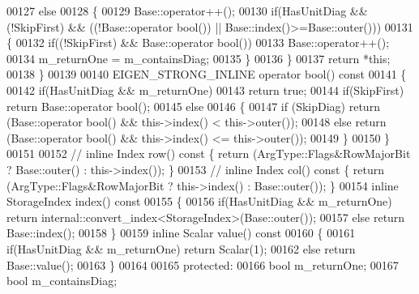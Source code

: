 \begin{DoxyCode}
00127         \textcolor{keywordflow}{else}
00128         \{
00129           Base::operator++();
00130           \textcolor{keywordflow}{if}(HasUnitDiag && (!SkipFirst) && ((!Base::operator \textcolor{keywordtype}{bool}()) || Base::index()>=Base::outer()))
00131           \{
00132             \textcolor{keywordflow}{if}((!SkipFirst) && Base::operator \textcolor{keywordtype}{bool}())
00133               Base::operator++();
00134             m\_returnOne = m\_containsDiag;
00135           \}
00136         \}
00137         \textcolor{keywordflow}{return} *\textcolor{keyword}{this};
00138       \}
00139       
00140       EIGEN\_STRONG\_INLINE \textcolor{keyword}{operator} bool()\textcolor{keyword}{ const}
00141 \textcolor{keyword}{      }\{
00142         \textcolor{keywordflow}{if}(HasUnitDiag && m\_returnOne)
00143           \textcolor{keywordflow}{return} \textcolor{keyword}{true};
00144         \textcolor{keywordflow}{if}(SkipFirst) \textcolor{keywordflow}{return}  Base::operator bool();
00145         \textcolor{keywordflow}{else}
00146         \{
00147           \textcolor{keywordflow}{if} (SkipDiag) \textcolor{keywordflow}{return} (Base::operator \textcolor{keywordtype}{bool}() && this->index() < this->outer());
00148           \textcolor{keywordflow}{else} \textcolor{keywordflow}{return} (Base::operator \textcolor{keywordtype}{bool}() && this->index() <= this->outer());
00149         \}
00150       \}
00151 
00152 \textcolor{comment}{//       inline Index row() const \{ return (ArgType::Flags&RowMajorBit ? Base::outer() : this->index()); \}}
00153 \textcolor{comment}{//       inline Index col() const \{ return (ArgType::Flags&RowMajorBit ? this->index() : Base::outer()); \}}
00154       \textcolor{keyword}{inline} StorageIndex index()\textcolor{keyword}{ const}
00155 \textcolor{keyword}{      }\{
00156         \textcolor{keywordflow}{if}(HasUnitDiag && m\_returnOne)  \textcolor{keywordflow}{return} internal::convert\_index<StorageIndex>(Base::outer());
00157         \textcolor{keywordflow}{else}                            \textcolor{keywordflow}{return} Base::index();
00158       \}
00159       \textcolor{keyword}{inline} Scalar value()\textcolor{keyword}{ const}
00160 \textcolor{keyword}{      }\{
00161         \textcolor{keywordflow}{if}(HasUnitDiag && m\_returnOne)  \textcolor{keywordflow}{return} Scalar(1);
00162         \textcolor{keywordflow}{else}                            \textcolor{keywordflow}{return} Base::value();
00163       \}
00164 
00165     \textcolor{keyword}{protected}:
00166       \textcolor{keywordtype}{bool} m\_returnOne;
00167       \textcolor{keywordtype}{bool} m\_containsDiag;

\end{DoxyCode}
